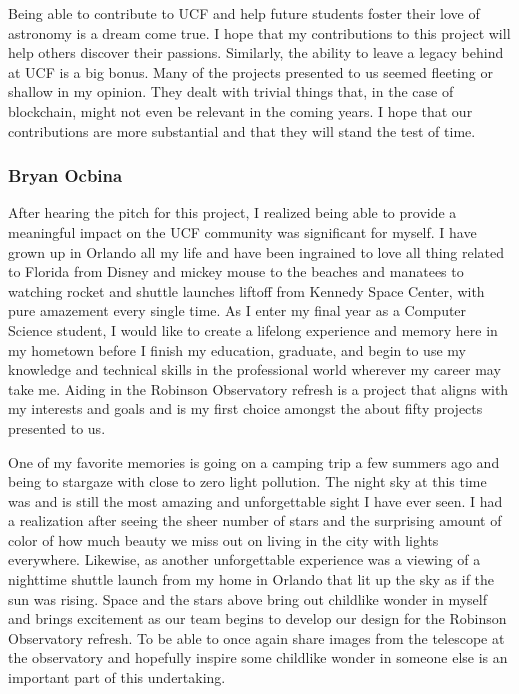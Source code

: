 \documentclass[12pt]{report}
\begin{document}
Being able to contribute to UCF and help future students foster their love of astronomy is a dream come true. I hope that my contributions to this project will help others discover their passions. Similarly, the ability to leave a legacy behind at UCF is a big bonus. Many of the projects presented to us seemed fleeting or shallow in my opinion. They dealt with trivial things that, in the case of blockchain, might not even be relevant in the coming years. I hope that our contributions are more substantial and that they will stand the test of time.

\subsubsection*{Bryan Ocbina}

After hearing the pitch for this project, I realized being able to provide a meaningful impact on the UCF community was significant for myself.  I have grown up in Orlando all my life and have been ingrained to love all thing related to Florida from Disney and mickey mouse to the beaches and manatees to watching rocket and shuttle launches liftoff from Kennedy Space Center, with pure amazement every single time.  As I enter my final year as a Computer Science student, I would like to create a lifelong experience and memory here in my hometown before I finish my education, graduate, and begin to use my knowledge and technical skills in the professional world wherever my career may take me.  Aiding in the Robinson Observatory refresh is a project that aligns with my interests and goals and is my first choice amongst the about fifty projects presented to us.

One of my favorite memories is going on a camping trip a few summers ago and being to stargaze with close to zero light pollution.  The night sky at this time was and is still the most amazing and unforgettable sight I have ever seen.  I had a realization after seeing the sheer number of stars and the surprising amount of color of how much beauty we miss out on living in the city with lights everywhere.  Likewise, as another unforgettable experience was a viewing of a nighttime shuttle launch from my home in Orlando that lit up the sky as if the sun was rising.  Space and the stars above bring out childlike wonder in myself and brings excitement as our team begins to develop our design for the Robinson Observatory refresh.  To be able to once again share images from the telescope at the observatory and hopefully inspire some childlike wonder in someone else is an important part of this undertaking.
\end{document}
